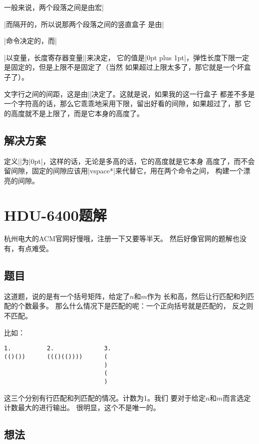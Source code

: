 一般来说，两个段落之间是由宏\vb|\par|而隔开的，所以说那两个段落之间的竖直盒子
是由\vb|\par|命令决定的，而\vb|\par|以变量，长度寄存器变量\vb|\parskip|来决定，
它的值是\vb|0pt plus 1pt|，弹性长度下限一定是固定的，但是上限不是固定了（当然
如果超过上限太多了，那它就是一个坏盒子了）。

文字行之间的间距，这是由\vb|\baselineskip|决定了。这就是说，如果我的这一行盒子
都差不多是一个字符高的话，那么它乖乖地采用下限，留出好看的间隙，如果超过了，那
它的高度就不是上限了，而是它本身的高度了。

\subsection{解决方案}

定义\vb|\baselineskip|为\vb|0pt|，这样的话，无论是多高的话，它的高度就是它本身
高度了，而不会留间隙，固定的间隙应该用\vb|vspace*|来代替它，用在两个命令之间，
构建一个漂亮的间隙。


\section{HDU-6400题解}

杭州电大的ACM官网好慢哦，注册一下又要等半天。
然后好像官网的题解也没有，有点难受。

\subsection{题目}

这道题，说的是有一个括号矩阵，给定了$n$和$m$作为
长和高，然后让行匹配和列匹配的个数最多。
那么什么情况下是匹配的呢：一个正向括号就是匹配的，
反之则不匹配。

比如：
\begin{lstlisting}
1.          2.              3.
(()())      ((()(())))      (
                            )
                            (
                            )
\end{lstlisting}

这三个分别有行匹配和列匹配的情况。计数为1。我们
要对于给定$n$和$m$而言选定计数最大的进行输出。
很明显，这个不是唯一的。

\subsection{想法}

